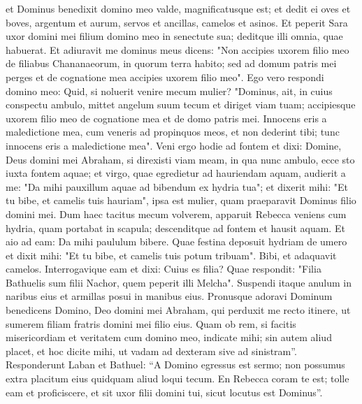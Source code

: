 \begin{biblechapter}
\begin{biblechapter}
\begin{biblechapter}
\begin{biblechapter}
\begin{biblechapter}
\begin{biblechapter}
\begin{biblechapter}
\begin{biblechapter}
\begin{biblechapter}
\begin{biblechapter}
\begin{biblechapter}
\begin{biblechapter}
\begin{biblechapter}
\begin{biblechapter}
\begin{biblechapter}
\begin{biblechapter}
\begin{biblechapter}
\begin{biblechapter}
\begin{biblechapter}
\begin{biblechapter}
\begin{biblechapter}
\begin{biblechapter}
\begin{biblechapter}
\begin{biblechapter}
\verse et Dominus benedixit domino meo valde, magnificatusque est; et dedit ei oves et boves, argentum et aurum, servos et ancillas, camelos et asinos. 
\verse Et peperit Sara uxor domini mei filium domino meo in senectute sua; deditque illi omnia, quae habuerat. 
\verse Et adiuravit me dominus meus dicens: "Non accipies uxorem filio meo de filiabus Chananaeorum, in quorum terra habito; 
\verse sed ad domum patris mei perges et de cognatione mea accipies uxorem filio meo". 
\verse Ego vero respondi domino meo: Quid, si noluerit venire mecum mulier? 
\verse "Dominus, ait, in cuius conspectu ambulo, mittet angelum suum tecum et diriget viam tuam; accipiesque uxorem filio meo de cognatione mea et de domo patris mei. 
\verse Innocens eris a maledictione mea, cum veneris ad propinquos meos, et non dederint tibi; tunc innocens eris a maledictione mea".
 \verse Veni ergo hodie ad fontem et dixi: Domine, Deus domini mei Abraham, si direxisti viam meam, in qua nunc ambulo, 
\verse ecce sto iuxta fontem aquae; et virgo, quae egredietur ad hauriendam aquam, audierit a me: "Da mihi pauxillum aquae ad bibendum ex hydria tua"; 
\verse et dixerit mihi: "Et tu bibe, et camelis tuis hauriam", ipsa est mulier, quam praeparavit Dominus filio domini mei.
 \verse Dum haec tacitus mecum volverem, apparuit Rebecca veniens cum hydria, quam portabat in scapula; descenditque ad fontem et hausit aquam. Et aio ad eam: Da mihi paululum bibere. 
\verse Quae festina deposuit hydriam de umero et dixit mihi: "Et tu bibe, et camelis tuis potum tribuam". Bibi, et adaquavit camelos. 
 \verse Interrogavique eam et dixi: Cuius es filia? Quae respondit: "Filia Bathuelis sum filii Nachor, quem peperit illi Melcha".
 Suspendi itaque anulum in naribus eius et armillas posui in manibus eius. 
\verse Pronusque adoravi Dominum benedicens Domino, Deo domini mei Abraham, qui perduxit me recto itinere, ut sumerem filiam fratris domini mei filio eius. 
 \verse Quam ob rem, si facitis misericordiam et veritatem cum domino meo, indicate mihi; sin autem aliud placet, et hoc dicite mihi, ut vadam ad dexteram sive ad sinistram”.
 \verse Responderunt Laban et Bathuel: “A Domino egressus est sermo; non possumus extra placitum eius quidquam aliud loqui tecum. 
\verse En Rebecca coram te est; tolle eam et proficiscere, et sit uxor filii domini tui, sicut locutus est Dominus”.

\end{biblechapter}
\end{biblechapter}
\end{biblechapter}
\end{biblechapter}
\end{biblechapter}
\end{biblechapter}
\end{biblechapter}
\end{biblechapter}
\end{biblechapter}
\end{biblechapter}
\end{biblechapter}
\end{biblechapter}
\end{biblechapter}
\end{biblechapter}
\end{biblechapter}
\end{biblechapter}
\end{biblechapter}
\end{biblechapter}
\end{biblechapter}
\end{biblechapter}
\end{biblechapter}
\end{biblechapter}
\end{biblechapter}
\end{biblechapter}

